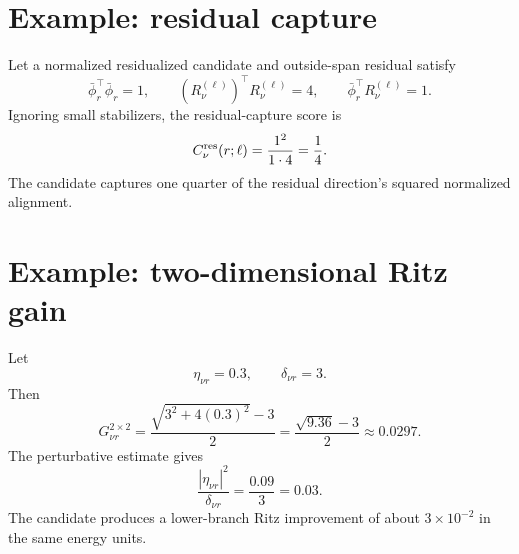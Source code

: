 \documentclass[10pt,twocolumn]{article}
\begin{document}
\section{Example: residual capture}

Let a normalized residualized candidate and outside-span residual satisfy
\begin{equation}
\bar\phi_r^\top\bar\phi_r=1,\qquad
(R_\nu^{(\ell)})^\top R_\nu^{(\ell)}=4,\qquad
\bar\phi_r^\top R_\nu^{(\ell)}=1.
\end{equation}
Ignoring small stabilizers, the residual-capture score is
\begin{equation}
C_\nu^{\rm res}(r;\ell)=\frac{1^2}{1\cdot4}=\frac14.
\end{equation}
The candidate captures one quarter of the residual direction's squared normalized alignment.

\section{Example: two-dimensional Ritz gain}

Let
\begin{equation}
\eta_{\nu r}=0.3,\qquad
\delta_{\nu r}=3.
\end{equation}
Then
\begin{equation}
G_{\nu r}^{2\times2}
=\frac{\sqrt{3^2+4(0.3)^2}-3}{2}
=\frac{\sqrt{9.36}-3}{2}
\approx 0.0297.
\end{equation}
The perturbative estimate gives
\begin{equation}
\frac{|\eta_{\nu r}|^2}{\delta_{\nu r}}
=\frac{0.09}{3}=0.03.
\end{equation}
The candidate produces a lower-branch Ritz improvement of about \(3\times10^{-2}\) in the same energy units.
\end{document}
